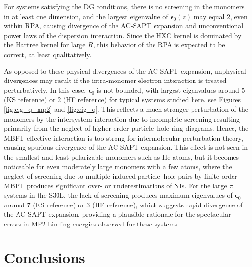 \documentclass[journal=jctcce,manuscript=article]{achemso}
\begin{document}
For systems satisfying the DG conditions, there is no screening in the
monomers in at least one dimension, and the largest eigenvalue of
$\boldsymbol{\epsilon}_{0}(z)$ may equal 2, even within RPA, causing
divergence of the AC-SAPT expansion and unconventional power laws of the
dispersion interaction. Since the HXC kernel is dominated by the Hartree
kernel for large $R$, this behavior of the RPA is expected to be
correct, at least qualitatively.

As opposed to these physical divergences of the AC-SAPT expansion,
unphysical divergences may result if the intra-monomer electron
interaction is treated perturbatively. In this case, 
$\boldsymbol{\epsilon}_{0}$ is not bounded, with largest eigenvalues
around 5 (KS reference) or 2 (HF reference) for typical systems studied
here, see Figures \ref{fig:eig_q_mp2} and \ref{fig:eig_q}. This reflects
a much stronger perturbation of the monomers by the intersystem
interaction due to incomplete screening resulting primarily from the
neglect of higher-order particle--hole ring diagrams. Hence, the MBPT
effective interaction is too strong for intermolecular perturbation
theory, causing spurious divergence of the AC-SAPT expansion. This effect
is not seen in the smallest and least polarizable monomers 
such as He atoms, but it becomes noticeable for even moderately large
monomers with a few atoms, where the neglect of screening due to
multiple induced particle--hole pairs by finite-order MBPT produces
significant over- or underestimations of NIs. For the large $\pi$
systems in the S30L, the lack of screening produces maximum eigenvalues
of $\boldsymbol{\epsilon}_{0}$ around 7 (KS reference) or 3 (HF
reference), which suggests rapid divergence of the AC-SAPT expansion,
providing a plausible rationale for the spectacular errors in MP2
binding energies observed for these systems.

\section{Conclusions}
\label{sec:conclusions}
\end{document}
